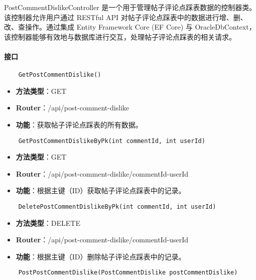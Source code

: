 PostCommentDislikeController 是一个用于管理帖子评论点踩表数据的控制器类。该控制器允许用户通过 RESTful API 对帖子评论点踩表中的数据进行增、删、改、查操作。通过集成 Entity Framework Core (EF Core) 与 OracleDbContext，该控制器能够有效地与数据库进行交互，处理帖子评论点踩表的相关请求。

\paragraph{接口}

\begin{verbatim}
	GetPostCommentDislike()
\end{verbatim}

\begin{itemize}
	\item \textbf{方法类型}：GET
	\item \textbf{Router}：/api/post-comment-dislike
	\item \textbf{功能}：获取帖子评论点踩表的所有数据。
\end{itemize}

\begin{verbatim}
	GetPostCommentDislikeByPk(int commentId, int userId)
\end{verbatim}

\begin{itemize}
	\item \textbf{方法类型}：GET
	\item \textbf{Router}：/api/post-comment-dislike/{commentId}-{userId}
	\item \textbf{功能}：根据主键（ID）获取帖子评论点踩表中的记录。
\end{itemize}

\begin{verbatim}
	DeletePostCommentDislikeByPk(int commentId, int userId)
\end{verbatim}

\begin{itemize}
	\item \textbf{方法类型}：DELETE
	\item \textbf{Router}：/api/post-comment-dislike/{commentId}-{userId}
	\item \textbf{功能}：根据主键（ID）删除帖子评论点踩表中的记录。
\end{itemize}

\begin{verbatim}
	PostPostCommentDislike(PostCommentDislike postCommentDislike)
\end{verbatim}

